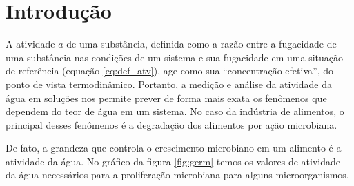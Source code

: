 \documentclass[
	12pt,				%
	openright,
	twoside,
	a4paper,			%
	english,			%
	french,				%
	spanish,			%
	brazil				%
	]{abntex2}
\begin{document}
\tableofcontents*
\cleardoublepage

\textual

\part{Introdução}

A atividade $a$ de uma substância, definida\cite{sandler2017} como
a razão entre a fugacidade de uma substância nas condições de um sistema
e sua fugacidade em uma situação de referência (equação \ref{eq:def_atv}),
age como sua ``concentração efetiva'', do ponto de vista termodinâmico.
Portanto, a medição e análise da atividade da água em soluções nos permite
prever de forma mais exata os fenômenos que dependem do teor de água em
um sistema. No caso da indústria de alimentos, o principal desses fenômenos
é a degradação dos alimentos por ação microbiana.

De fato, a grandeza que controla o crescimento microbiano em um alimento é a
atividade da água. No gráfico da figura \ref{fig:germ} temos os valores de
atividade da água necessários para a proliferação microbiana para alguns
microorganismos.
\end{document}
